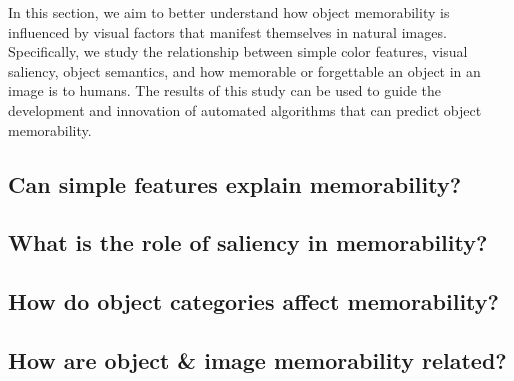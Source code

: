 

In this section, we aim to better understand how object memorability is influenced by visual factors that manifest themselves in natural images. Specifically, we study the relationship between simple color features, visual saliency, object semantics, and how memorable or forgettable an object in an image is to humans. The results of this study can be used to guide the development and innovation of automated algorithms that can predict object memorability.


\subsection{Can simple features explain memorability?}



\subsection{What is the role of saliency in memorability?}

 \label{sec:fix}

\subsection{How do object categories affect memorability?}



\subsection{How are object \& image memorability related?}



